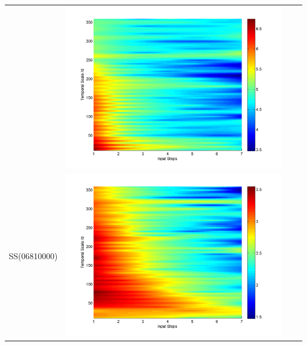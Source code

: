 \documentclass[11pt]{article}
\begin{document}
\begin{table}[H]
{\begin{tabular}{cccc}
&\begin{minipage}{.3\textwidth}\includegraphics[width=\linewidth]{resultgraph/AU/11532500pepq_rela.png}\end{minipage}
\\
SS(06810000)
&\begin{minipage}{.3\textwidth}\includegraphics[width=\linewidth]{resultgraph/AU/06810000p_rela.png}\end{minipage}

\end{tabular}}
\end{table}
\end{document}
